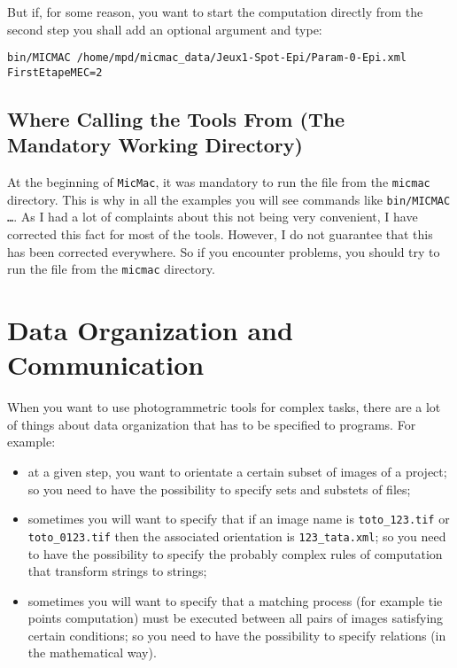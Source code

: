 But if, for some reason, you want to start the computation directly
from the second step you shall add an optional argument and type:

\begin{verbatim}
bin/MICMAC /home/mpd/micmac_data/Jeux1-Spot-Epi/Param-0-Epi.xml  FirstEtapeMEC=2
\end{verbatim}


\subsection{Where Calling the Tools From (The Mandatory Working Directory)}

At the beginning of {\tt MicMac}, it was mandatory to run the file from the
{\tt micmac} directory. This is why in all the examples you will see
commands like {\tt bin/MICMAC \dots}. As I had a lot of complaints
about this not being very convenient, I have corrected this fact for most
of the tools.  However, I do not guarantee that this has been corrected
everywhere. So if you encounter problems,  you should try to run the file
from the {\tt micmac} directory.




\section{Data Organization and Communication}

When you want to use photogrammetric tools for complex tasks, there are a lot
of things about data organization that has to be specified to programs.
For example:

\begin{itemize}
   \item  at  a given step, you want to orientate a certain subset of images of a
          project; so you need  to have the possibility to specify sets
          and substets of files;

   \item  sometimes you will want to specify that if an image name is
          {\tt toto\_123.tif} or  {\tt toto\_0123.tif}  then the associated orientation is
          {\tt 123\_tata.xml}; so you need to have the possibility to specify the probably complex
          rules of computation that transform strings to strings;

   \item  sometimes you will want to specify that a matching process (for example
          tie points computation) must be executed between all pairs of images satisfying
          certain conditions; so  you need to have the possibility to specify relations
          (in the mathematical way).
\end{itemize}

